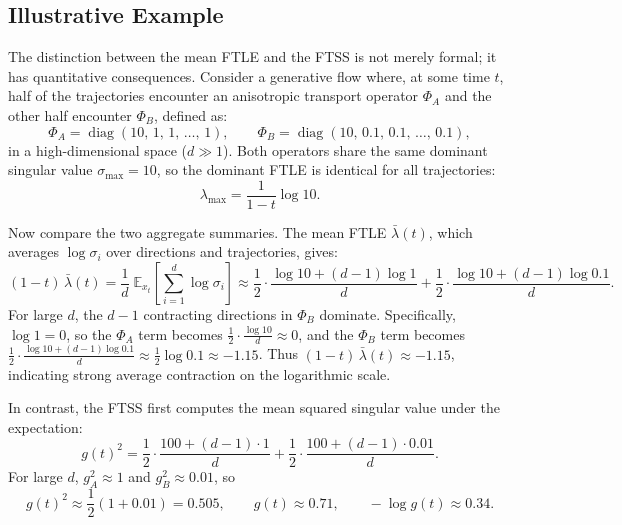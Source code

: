 \documentclass[11pt]{article}
\begin{document}
\subsection{Illustrative Example}

The distinction between the mean FTLE and the FTSS is not merely formal; it 
has quantitative consequences. Consider a generative flow where, at some time 
$t$, half of the trajectories encounter an anisotropic transport operator 
$\Phi_A$ and the other half encounter $\Phi_B$, defined as:
\begin{equation}
\Phi_A = \operatorname{diag}(10,\,1,\,1,\,\ldots,\,1), \qquad
\Phi_B = \operatorname{diag}(10,\,0.1,\,0.1,\,\ldots,\,0.1),
\end{equation}
in a high-dimensional space ($d \gg 1$). Both operators share the same 
dominant singular value $\sigma_{\max}=10$, so the dominant FTLE is identical 
for all trajectories:
\begin{equation}
\lambda_{\max} = \frac{1}{1-t}\log 10.
\end{equation}

Now compare the two aggregate summaries. The mean FTLE $\bar{\lambda}(t)$, 
which averages $\log\sigma_i$ over directions and trajectories, gives:
\begin{equation}
(1-t)\,\bar{\lambda}(t) 
= \frac{1}{d}\;\mathbb{E}_{x_t}\!\left[\sum_{i=1}^{d} \log\sigma_i\right]
\approx \frac{1}{2}\cdot\frac{\log 10 + (d-1)\log 1}{d} 
     + \frac{1}{2}\cdot\frac{\log 10 + (d-1)\log 0.1}{d}.
\end{equation}
For large $d$, the $d-1$ contracting directions in $\Phi_B$ dominate. 
Specifically, $\log 1 = 0$, so the $\Phi_A$ term becomes $\frac{1}{2}\cdot\frac{\log 10}{d} \approx 0$, 
and the $\Phi_B$ term becomes $\frac{1}{2}\cdot\frac{\log 10 + (d-1)\log 0.1}{d} \approx \frac{1}{2}\log 0.1 \approx -1.15$.
Thus $(1-t)\,\bar{\lambda}(t) \approx -1.15$, indicating strong average contraction 
on the logarithmic scale.

In contrast, the FTSS first computes the mean squared singular value under 
the expectation:
\begin{equation}
g(t)^2 = \frac{1}{2}\cdot\frac{100 + (d-1)\cdot 1}{d} 
      + \frac{1}{2}\cdot\frac{100 + (d-1)\cdot 0.01}{d}.
\end{equation}
For large $d$, $g_A^2 \approx 1$ and $g_B^2 \approx 0.01$, so
\begin{equation}
g(t)^2 \approx \frac{1}{2}(1 + 0.01) = 0.505, \qquad 
g(t) \approx 0.71, \qquad 
-\log g(t) \approx 0.34.
\end{equation}
\end{document}
